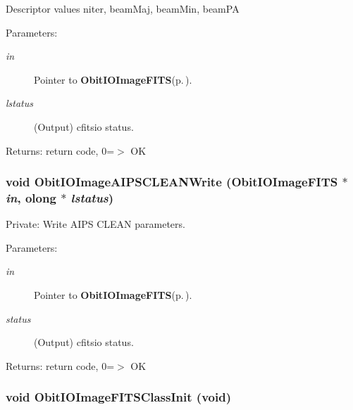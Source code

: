 Descriptor values niter, beam\-Maj, beam\-Min, beam\-PA \begin{Desc}
\item[Parameters:]
\begin{description}
\item[{\em in}]Pointer to {\bf Obit\-IOImage\-FITS}{\rm (p.\,\pageref{structObitIOImageFITS})}. \item[{\em lstatus}](Output) cfitsio status. \end{description}
\end{Desc}
\begin{Desc}
\item[Returns:]return code, 0=$>$ OK \end{Desc}
\subsubsection{\setlength{\rightskip}{0pt plus 5cm}void Obit\-IOImage\-AIPSCLEANWrite ({\bf Obit\-IOImage\-FITS} $\ast$ {\em in}, {\bf olong} $\ast$ {\em lstatus})}\label{ObitIOImageFITS_8c_a6}


Private: Write AIPS CLEAN parameters. 

\begin{Desc}
\item[Parameters:]
\begin{description}
\item[{\em in}]Pointer to {\bf Obit\-IOImage\-FITS}{\rm (p.\,\pageref{structObitIOImageFITS})}. \item[{\em status}](Output) cfitsio status. \end{description}
\end{Desc}
\begin{Desc}
\item[Returns:]return code, 0=$>$ OK \end{Desc}
\subsubsection{\setlength{\rightskip}{0pt plus 5cm}void Obit\-IOImage\-FITSClass\-Init (void)}\label{ObitIOImageFITS_8c_a38}


